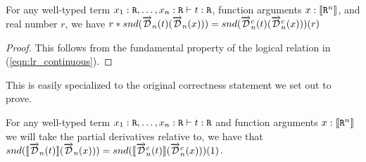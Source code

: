   \begin{theorem}
    For any well-typed term $x_1 : \texttt{R}, \dots, x_n : \texttt{R} \vdash t : \texttt{R}$, function arguments $x : \llbracket \texttt{R}^n \rrbracket$, and real number $r$, we have $r * snd(\overrightarrow{\mathcal{D}}_n(t)(\overrightarrow{\mathcal{D}}_n(x))) = snd(\overrightarrow{\mathcal{D}}^c_n(t)(\overrightarrow{\mathcal{D}}^c_n(x)))(r)$
  \end{theorem}
  \begin{proof}
    This follows from the fundamental property of the logical relation in (\cref{eqn:lr_continuous}).
  \end{proof}

  This is easily specialized to the original correctness statement we set out to prove.

  \begin{corollary}
    For any well-typed term $x_1 : \texttt{R}, \dots, x_n : \texttt{R} \vdash t : \texttt{R}$ and function arguments $x : \llbracket \texttt{R}^n \rrbracket$ we will take the partial derivatives relative to, we have that $snd(\llbracket\overrightarrow{\mathcal{D}}_n(t)\rrbracket (\overrightarrow{\mathcal{D}}_n(x))) = snd(\llbracket\overrightarrow{\mathcal{D}}^c_n(t)\rrbracket (\overrightarrow{\mathcal{D}}^c_n(x)))(1)$.
  \end{corollary}
